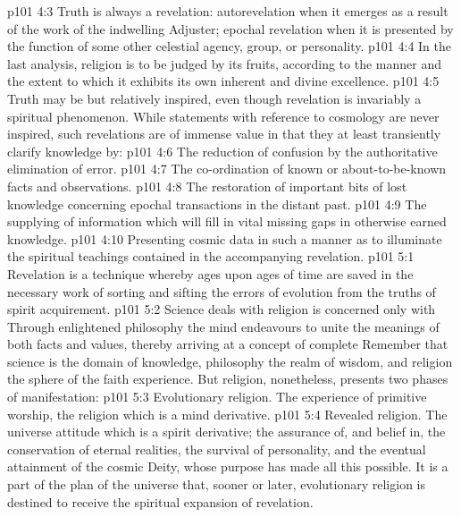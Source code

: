 \vs p101 4:3 \pc Truth is always a revelation: autorevelation when it emerges as a result of the work of the indwelling Adjuster; epochal revelation when it is presented by the function of some other celestial agency, group, or personality.
\vs p101 4:4 In the last analysis, religion is to be judged by its fruits, according to the manner and the extent to which it exhibits its own inherent and divine excellence.
\vs p101 4:5 \pc Truth may be but relatively inspired, even though revelation is invariably a spiritual phenomenon. While statements with reference to cosmology are never inspired, such revelations are of immense value in that they at least transiently clarify knowledge by:
\vs p101 4:6 \bibnobreakspace The reduction of confusion by the authoritative elimination of error.
\vs p101 4:7 \bibnobreakspace The co\hyp{}ordination of known or about\hyp{}to\hyp{}be\hyp{}known facts and observations.
\vs p101 4:8 \bibnobreakspace The restoration of important bits of lost knowledge concerning epochal transactions in the distant past.
\vs p101 4:9 \bibnobreakspace The supplying of information which will fill in vital missing gaps in otherwise earned knowledge.
\vs p101 4:10 \bibnobreakspace Presenting cosmic data in such a manner as to illuminate the spiritual teachings contained in the accompanying revelation.
\vs p101 5:1 Revelation is a technique whereby ages upon ages of time are saved in the necessary work of sorting and sifting the errors of evolution from the truths of spirit acquirement.
\vs p101 5:2 Science deals with  religion is concerned only with  Through enlightened philosophy the mind endeavours to unite the meanings of both facts and values, thereby arriving at a concept of complete  Remember that science is the domain of knowledge, philosophy the realm of wisdom, and religion the sphere of the faith experience. But religion, nonetheless, presents two phases of manifestation:
\vs p101 5:3 \bibnobreakspace Evolutionary religion. The experience of primitive worship, the religion which is a mind derivative.
\vs p101 5:4 \bibnobreakspace Revealed religion. The universe attitude which is a spirit derivative; the assurance of, and belief in, the conservation of eternal realities, the survival of personality, and the eventual attainment of the cosmic Deity, whose purpose has made all this possible. It is a part of the plan of the universe that, sooner or later, evolutionary religion is destined to receive the spiritual expansion of revelation.
